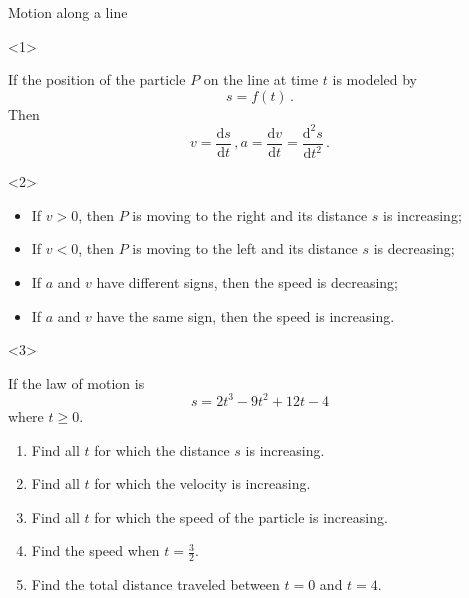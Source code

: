 \begin{frame}{Motion along a line}

\begin{onlyenv}<1>


If the position of the particle $P$ on the line at time $t$ is modeled
by
\[
s=f\left(t\right)\,.
\]
Then
\[
v=\frac{\mathrm{d}s}{\mathrm{d}t}\,,a=\frac{\mathrm{d}v}{\mathrm{d}t}=\frac{\mathrm{d}^{2}s}{\mathrm{d}t^{2}}\,.
\]


\end{onlyenv}



\begin{onlyenv}<2>

\begin{itemize}
\item If $v>0$, then $P$ is moving to the right and its distance $s$
is increasing;
\item If $v<0$, then $P$ is moving to the left and its distance $s$ is
decreasing;
\item If $a$ and $v$ have different signs, then the speed is decreasing;
\item If $a$ and $v$ have the same sign, then the speed is increasing.
\end{itemize}
\end{onlyenv}



\begin{onlyenv}<3>

\begin{example}
If the law of motion is
\[
s=2t^{3}-9t^{2}+12t-4
\]
where $t\ge0$.
\begin{enumerate}
\item Find all $t$ for which the distance $s$ is increasing.
\item Find all $t$ for which the velocity is increasing.
\item Find all $t$ for which the speed of the particle is increasing.
\item Find the speed when $t=\frac{3}{2}$.
\item Find the total distance traveled between $t=0$ and $t=4$.
\end{enumerate}

\end{example}

\end{onlyenv}

\end{frame}


